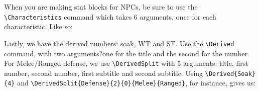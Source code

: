 \documentclass[11pt]{book}
\begin{document}
When you are making stat blocks for NPCs, be sure to use the \verb|\Characteristics| command which takes 6 arguments, once for each characteristic. Like so:

\vspace{1em}


\vspace{1em}

Lastly, we have the derived numbers: soak, WT and ST. Use the \verb|\Derived| command, with two arguments?one for the title and the second for the number. For Melee/Ranged defense, we use \verb|\DerivedSplit| with 5 arguments: title, first number, second number, first subtitle and second subtitle. Using \verb|\Derived{Soak}{4}| and \verb|\DerivedSplit{Defense}{2}{0}{Melee}{Ranged}|, for instance, gives us:

\vspace{1em}

\qquad{}
\end{document}
